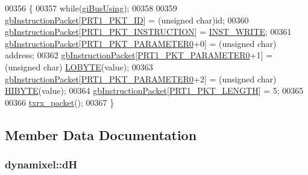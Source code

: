 \begin{DoxyCode}
00356 \{
00357     \textcolor{keywordflow}{while}(\hyperlink{classdynamixel_ad10e0e49f5fef04bf789a89c14cc470a}{giBusUsing});
00358 
00359     \hyperlink{classdynamixel_afd94dcf01b8e96298727776e222de722}{gbInstructionPacket}[\hyperlink{dynamixel_8h_a3c2bb339c587abadd977eb2f14daeff9}{PRT1\_PKT\_ID}] = (\textcolor{keywordtype}{unsigned} char)\textcolor{keywordtype}{id};
00360     \hyperlink{classdynamixel_afd94dcf01b8e96298727776e222de722}{gbInstructionPacket}[\hyperlink{dynamixel_8h_a3da1d083c018994fb0c859f4e06e1f78}{PRT1\_PKT\_INSTRUCTION}] = 
      \hyperlink{dynamixel_8h_a1c304d06170982719fd605a87c9101f0}{INST\_WRITE};
00361     \hyperlink{classdynamixel_afd94dcf01b8e96298727776e222de722}{gbInstructionPacket}[\hyperlink{dynamixel_8h_a939ef836d0605d2f4f9372df3ea0855f}{PRT1\_PKT\_PARAMETER0}+0] = (\textcolor{keywordtype}{unsigned} char)
      address;
00362     \hyperlink{classdynamixel_afd94dcf01b8e96298727776e222de722}{gbInstructionPacket}[\hyperlink{dynamixel_8h_a939ef836d0605d2f4f9372df3ea0855f}{PRT1\_PKT\_PARAMETER0}+1] = (\textcolor{keywordtype}{unsigned} char)
      \hyperlink{dynamixel_8h_a04c0416272e5c07bdf955d803a21688e}{LOBYTE}(value);
00363     \hyperlink{classdynamixel_afd94dcf01b8e96298727776e222de722}{gbInstructionPacket}[\hyperlink{dynamixel_8h_a939ef836d0605d2f4f9372df3ea0855f}{PRT1\_PKT\_PARAMETER0}+2] = (\textcolor{keywordtype}{unsigned} char)
      \hyperlink{dynamixel_8h_a75c5b5f21e837e80c0feb4da9a421f87}{HIBYTE}(value);
00364     \hyperlink{classdynamixel_afd94dcf01b8e96298727776e222de722}{gbInstructionPacket}[\hyperlink{dynamixel_8h_ab24601f91d0364e4b62edad3c2a0a5c4}{PRT1\_PKT\_LENGTH}] = 5;
00365     
00366     \hyperlink{classdynamixel_aebfc569c6b1eb0b98f8c385f0f921fc0}{txrx\_packet}();
00367 \}
\end{DoxyCode}


\subsection{Member Data Documentation}
\hypertarget{classdynamixel_ae003cc90ada6d7b70eaa4ea9d42d4deb}{}
\subsubsection[{d\+H}]{ dynamixel\+::d\+H\hspace{0.3cm}{\ttfamily [private]}}\label{classdynamixel_ae003cc90ada6d7b70eaa4ea9d42d4deb}
\hypertarget{classdynamixel_a5b603f6bed7ccc595f1f50bd6a6ebbfc}{}

